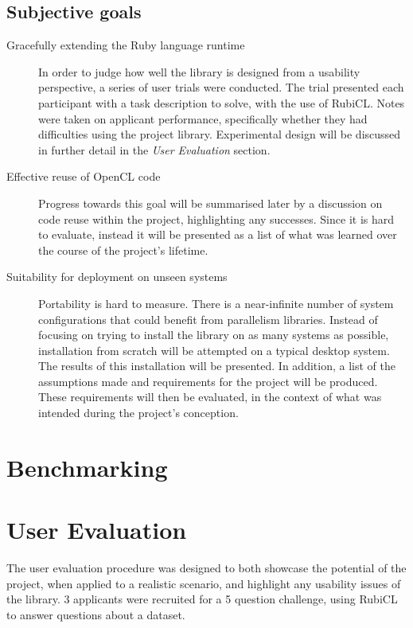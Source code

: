 \subsection{Subjective goals}
\begin{description}
\item[Gracefully extending the Ruby language runtime]
In order to judge how well the library is designed from a usability perspective, a series of user trials were conducted.
The trial presented each participant with a task description to solve, with the use of RubiCL.
Notes were taken on applicant performance, specifically whether they had difficulties using the project library.
Experimental design will be discussed in further detail in the \emph{User Evaluation} section.
\item[Effective reuse of \ac{OpenCL} code]
Progress towards this goal will be summarised later  by a discussion on code reuse within the project, highlighting any successes. Since it is hard to evaluate, instead it will be presented as a list of what was learned over the course of the project's lifetime.
\item[Suitability for deployment on unseen systems]
Portability is hard to measure. There is a near-infinite number of system configurations that could benefit from parallelism libraries. Instead of focusing on trying to install the library on as many systems as possible, installation from scratch will be attempted on a typical desktop system.  The results of this installation will be presented. In addition, a list of the assumptions made and requirements for the project will be produced. These requirements will then be evaluated, in the context of what was intended during the project's conception.
\end{description}

\section{Benchmarking}

\section{User Evaluation}
The user evaluation procedure was designed to both showcase the potential of the project, when applied to a realistic scenario, and highlight any usability issues of the library.
3 applicants were recruited for a 5 question challenge, using RubiCL to answer questions about a dataset.

